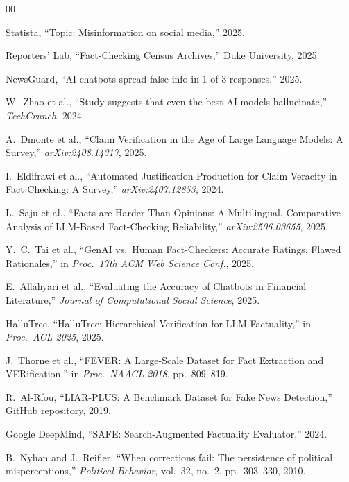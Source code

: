 \documentclass[conference]{IEEEtran}
\begin{document}
\begin{thebibliography}{00}

Statista, ``Topic: Misinformation on social media,'' 2025.

Reporters' Lab, ``Fact-Checking Census Archives,'' Duke University, 2025.

NewsGuard, ``AI chatbots spread false info in 1 of 3 responses,'' 2025.

W.\ Zhao et al., ``Study suggests that even the best AI models hallucinate,'' \textit{TechCrunch}, 2024.

A.\ Dmonte et al., ``Claim Verification in the Age of Large Language Models: A Survey,'' \textit{arXiv:2408.14317}, 2025.

I.\ Eldifrawi et al., ``Automated Justification Production for Claim Veracity in Fact Checking: A Survey,'' \textit{arXiv:2407.12853}, 2024.

L.\ Saju et al., ``Facts are Harder Than Opinions: A Multilingual, Comparative Analysis of LLM-Based Fact-Checking Reliability,'' \textit{arXiv:2506.03655}, 2025.

Y.\ C.\ Tai et al., ``GenAI vs.\ Human Fact-Checkers: Accurate Ratings, Flawed Rationales,'' in \textit{Proc.\ 17th ACM Web Science Conf.}, 2025.

E.\ Allahyari et al., ``Evaluating the Accuracy of Chatbots in Financial Literature,'' \textit{Journal of Computational Social Science}, 2025.

HalluTree, ``HalluTree: Hierarchical Verification for LLM Factuality,'' in \textit{Proc.\ ACL 2025}, 2025.

J.\ Thorne et al., ``FEVER: A Large-Scale Dataset for Fact Extraction and VERification,'' in \textit{Proc.\ NAACL 2018}, pp.\ 809--819.

R.\ Al-Rfou, ``LIAR-PLUS: A Benchmark Dataset for Fake News Detection,'' GitHub repository, 2019.

Google DeepMind, ``SAFE: Search-Augmented Factuality Evaluator,'' 2024.

B.\ Nyhan and J.\ Reifler, ``When corrections fail: The persistence of political misperceptions,'' \textit{Political Behavior}, vol.\ 32, no.\ 2, pp.\ 303--330, 2010.

\end{thebibliography}
\end{document}
